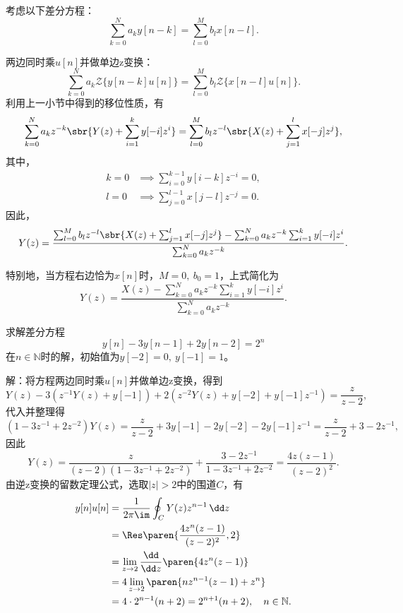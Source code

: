 考虑以下差分方程：
\begin{equation}
    \sum_{k=0}^{N}a_k y[n-k]=\sum_{l=0}^{M}b_l x[n-l].
\end{equation}

两边同时乘$u[n]$并做单边z变换：
\begin{equation}
    \sum_{k=0}^{N}a_k \mathcal{Z}\{y[n-k]u[n]\}=\sum_{l=0}^{M}b_l \mathcal{Z}\{x[n-l]u[n]\}.
\end{equation}
利用上一小节中得到的移位性质，有
\begin{equation}
    \sum_{k=0}^{N}a_k z^{-k}\sbr{Y(z)+\sum_{i=1}^{k}y[-i]z^{i}}=\sum_{l=0}^{M}b_l z^{-l}\sbr{X(z)+\sum_{j=1}^{l}x[-j]z^{j}},
\end{equation}
其中，
\begin{align}
    k=0&\implies \sum_{i=0}^{k-1}y[i-k]z^{-i}=0, \\
    l=0&\implies \sum_{j=0}^{l-1}x[j-l]z^{-j}=0.
\end{align}
因此，
\begin{equation}
    Y(z)=\frac{\sum_{l=0}^{M}b_l z^{-l}\sbr{X(z)+\sum_{j=1}^{l}x[-j]z^{j}}-\sum_{k=0}^{N}a_k z^{-k}\sum_{i=1}^{k}y[-i]z^{i}}{\sum_{k=0}^{N}a_k z^{-k}}.
\end{equation}

特别地，当方程右边恰为$x[n]$时，$M=0,\ b_0=1$，上式简化为
\begin{equation}
    Y(z)=\frac{X(z)-\sum_{k=0}^{N}a_k z^{-k}\sum_{i=1}^{k}y[-i]z^{i}}{\sum_{k=0}^{N}a_k z^{-k}}.
\end{equation}

\begin{example}
    求解差分方程
    \begin{equation}
        y[n]-3y[n-1]+2y[n-2]=2^n
    \end{equation}
    在$n\in\mathbb{N}$时的解，初始值为$y[-2]=0,\ y[-1]=1$。

    解：将方程两边同时乘$u[n]$并做单边z变换，得到
    \begin{equation}
        Y(z)-3(z^{-1}Y(z)+y[-1])+2(z^{-2}Y(z)+y[-2]+y[-1]z^{-1})=\frac{z}{z-2},
    \end{equation}
    代入并整理得
    \begin{equation}
        (1-3z^{-1}+2z^{-2})Y(z)=\frac{z}{z-2}+3y[-1]-2y[-2]-2y[-1]z^{-1}=\frac{z}{z-2}+3-2z^{-1},
    \end{equation}
    因此
    \begin{equation}
        Y(z)=\frac{z}{(z-2)(1-3z^{-1}+2z^{-2})}+\frac{3-2z^{-1}}{1-3z^{-1}+2z^{-2}}=\frac{4z(z-1)}{(z-2)^2}.
    \end{equation}
    由逆z变换的留数定理公式，选取$|z|>2$中的围道$C$，有
    \begin{align}
        y[n]u[n]&=\frac{1}{2\pi\im}\oint_{C}Y(z)z^{n-1}\,\dd z \nonumber \\
        &=\Res\paren{\frac{4z^n(z-1)}{(z-2)^2},2} \nonumber \\
        &=\lim_{z\to 2}\frac{\dd}{\dd z}\paren{4z^n(z-1)} \nonumber \\
        &=4\lim_{z\to 2}\paren{nz^{n-1}(z-1)+z^n} \nonumber \\
        &=4\cdot 2^{n-1}(n+2)=2^{n+1}(n+2),\quad n\in\mathbb{N}.
    \end{align}
\end{example}
